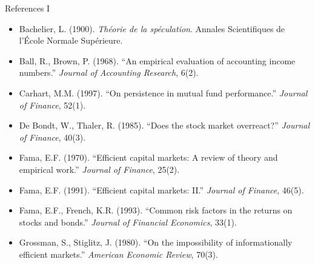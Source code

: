 \documentclass[9pt, aspectratio=169, t]{beamer}
\theoremstyle{definition}
\newenvironment{cminipage}[1]{%
    \par\noindent\hfill\begin{minipage}{#1}\ignorespaces
}{%
    \end{minipage}\hfill\null\par
}
\begin{document}
\begin{frame}{References I}
\begin{cminipage}{0.95\textwidth}
{\small
\begin{itemize}\setlength{\itemsep}{2pt}
    \item Bachelier, L. (1900). \textit{Th\'{e}orie de la sp\'{e}culation}. Annales Scientifiques de l'\'{E}cole Normale Sup\'{e}rieure.
    \item Ball, R., Brown, P. (1968). ``An empirical evaluation of accounting income numbers.'' \textit{Journal of Accounting Research}, 6(2).
    \item Carhart, M.M. (1997). ``On persistence in mutual fund performance.'' \textit{Journal of Finance}, 52(1).
    \item De Bondt, W., Thaler, R. (1985). ``Does the stock market overreact?'' \textit{Journal of Finance}, 40(3).
    \item Fama, E.F. (1970). ``Efficient capital markets: A review of theory and empirical work.'' \textit{Journal of Finance}, 25(2).
    \item Fama, E.F. (1991). ``Efficient capital markets: II.'' \textit{Journal of Finance}, 46(5).
    \item Fama, E.F., French, K.R. (1993). ``Common risk factors in the returns on stocks and bonds.'' \textit{Journal of Financial Economics}, 33(1).
    \item Grossman, S., Stiglitz, J. (1980). ``On the impossibility of informationally efficient markets.'' \textit{American Economic Review}, 70(3).
\end{itemize}
}
\end{cminipage}
\end{frame}
\end{document}
